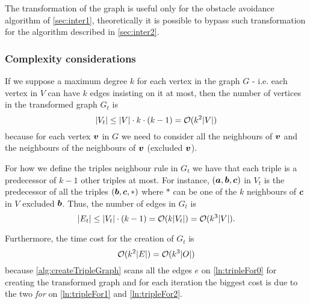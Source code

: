 \documentclass[dissertation.tex]{subfiles}
\begin{document}
The transformation of the graph is useful only for the obstacle
avoidance algorithm of
\cref{sec:inter1}, theoretically it is possible to bypass such
transformation for the algorithm described in \cref{sec:inter2}.

\subsubsection{Complexity considerations}
If we suppose a maximum degree $k$ for each vertex in the graph $G$ -
i.e. each vertex in $V$ can have $k$ edges insisting on
it at most, then the number of vertices in the transformed graph $G_t$ is 
\begin{equation}
  \label{eq:numTriples}
  |V_t|\leq |V|\cdot k\cdot(k-1)=\mathcal{O}(k^2|V|)
\end{equation}
because for each vertex $\boldsymbol{v}$ in $G$ we need to
consider all the neighbours of $\boldsymbol{v}$ and the neighbours of the neighbours
of $\boldsymbol{v}$ (excluded $\boldsymbol{v}$).

For how we define the triples neighbour rule in $G_t$ we have
that each triple is a predecessor of $k-1$ other triples at most. For
instance, $(\boldsymbol{a},\boldsymbol{b},\boldsymbol{c})$ in $V_t$ is the predecessor of all the triples
$(\boldsymbol{b},\boldsymbol{c},*)$ where $*$ can be one of the $k$ neighbours
of $\boldsymbol{c}$ in $V$ excluded $\boldsymbol{b}$. Thus, the number of edges in $G_t$ is
\begin{equation}
  \label{eq:numEdgesTriples}
  |E_t|\leq |V_t|\cdot (k-1)=\mathcal{O}(k|V_t|)=\mathcal{O}(k^3|V|).
\end{equation}

Furthermore, the time cost for the creation of $G_t$ is
\newcommand{\eqCostVt}{\ensuremath{\bigO(k^3|\obsSet|)}}
\begin{equation}
  \label{eq:costVt}
  \bigO(k^2|E|)=\eqCostVt
\end{equation}
because \cref{alg:createTripleGraph} scans all the edges $e$ on
\cref{ln:tripleFor0} for creating the transformed
graph and for each
iteration
the biggest cost is due to the two \emph{for} on \cref{ln:tripleFor1} and
\cref{ln:tripleFor2}.
\end{document}
